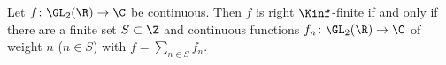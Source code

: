 Let $f\colon\GL_2(\R)\to\C$ be continuous. Then $f$ is right $\Kinf$-finite if and only if there are a finite set
$S\subset\Z$ and continuous functions $f_n\colon\GL_2(\R)\to\C$ of weight $n$ ($n\in S$) with $f=\sum_{n\in S}f_n$.
